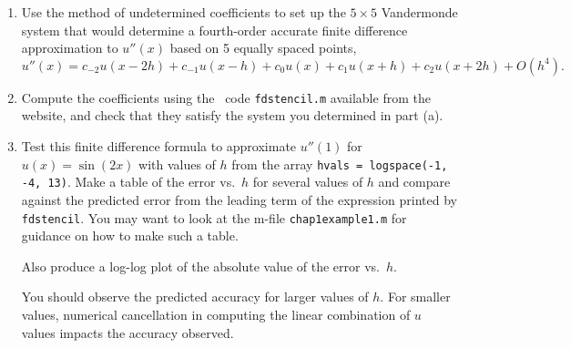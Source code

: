 

\begin{enumerate}
\item
Use the method of undetermined coefficients to set up the $5\times 5$
Vandermonde system that would determine a fourth-order accurate
finite difference approximation to $u''(x)$ based on 5 equally spaced
points,
\[
u''(x) = c_{-2} u(x-2h) + c_{-1} u(x-h) + c_0u(x) + c_1u(x+h) +
c_2u(x+2h) + O(h^4).
\]

\item 
Compute the coefficients using the 
\matlab\ code {\tt fdstencil.m} available from the website, and check that
they satisfy the system you determined in part (a).

\item
Test this finite difference formula to approximate $u''(1)$ for 
$u(x) = \sin(2x)$ with values of $h$ from the array 
{\tt hvals = logspace(-1, -4, 13)}.
Make a
table of the error vs.\ $h$ for several values of $h$ and compare against
the predicted error from the leading term of the expression printed by
{\tt fdstencil}. 
You may want to look at the m-file {\tt chap1example1.m} for
guidance on how to make such a table.

Also produce a log-log plot of the absolute value of the error vs.~$h$.  

You should observe the predicted accuracy for larger values of $h$.  For
smaller values, numerical cancellation in computing the linear combination
of $u$ values impacts the accuracy observed.
\end{enumerate}
